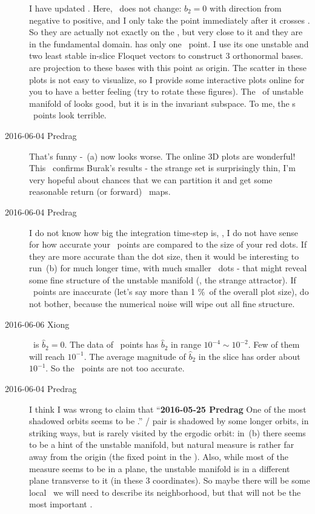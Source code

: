 \begin{description}
I have updated . Here, \PoincSec\ does not change:
$\hat{b}_2 = 0$ with direction from negative to positive, and I only
take the point immediately after it crosses \PoincSec. So they are
actually not exactly on the \PoincSec, but very close to it and they
are in the fundamental domain.  has only one \PoincSec\ point.
I use its one unstable and two least stable
in-slice Floquet vectors to construct 3 orthonormal bases.
 are projection to these bases with this point
as origin. The scatter in these plots is not easy to visualize, so I provide
some interactive plots online for you to have a better feeling (try to
rotate these figures).
The \PoincSec\ of unstable manifold of  looks good, but it is in
the invariant subspace. To me, the \po s \PoincSec\ points look terrible.

\item[2016-06-04 Predrag]
That's funny - \,(a) now looks worse. The online
3D plots are wonderful! This \PoincSec\ confirms Burak's results - the
strange set is surprisingly thin, I'm very hopeful about chances that we
can partition it and get some reasonable return (or forward) \Poincare\
maps.

\item[2016-06-04 Predrag]
I do not know how big the integration time-step
is, \ie, I do not have sense for how accurate your \PoincSec\ points are
compared to the size of your red dots. If they are more accurate than the
dot size, then it would be interesting to run
\,(b) for much longer time, with much smaller
\PoincSec\ dots - that might reveal some fine structure of the unstable
manifold (\ie, the strange attractor). If \PoincSec\ points are
inaccurate (let's say more than 1 \%\ of the overall plot size), do not
bother, because the numerical noise will wipe out all fine structure.

\item[2016-06-06 Xiong] \PoincSec\ is $\hat{b}_2 = 0$. The data of
\PoincSec\ points has $\hat{b}_2$ in range $10^{-4}\sim 10^{-2}$. Few
of them will reach $10^{-1}$. The average magnitude of $\hat{b}_2$
in the slice has order about $10^{-1}$. So the \PoincSec\ points are
not too accurate.

\item[2016-06-04 Predrag]
I think I was wrong to claim that ``{\bf 2016-05-25 Predrag} One of the
most shadowed orbits seems to be .'' \RPO{1} / \PPO{2} pair is
shadowed by some longer orbits, in striking ways, but is rarely visited
by the ergodic orbit: in \reffig{fig:ksfundPoinc}\,(b) there seems to be
a hint of the  unstable manifold, but natural measure is rather
far away from the origin (the  fixed point in the \PoincSec).
Also, while most of the measure seems to be in a plane, the \RPO{1}
unstable manifold is in a different plane transverse to it (in these 3
coordinates). So maybe there will be some local \PoincSec\ we will
need to describe its neighborhood, but that will not be the most
important \PoincSec.


\end{description}
